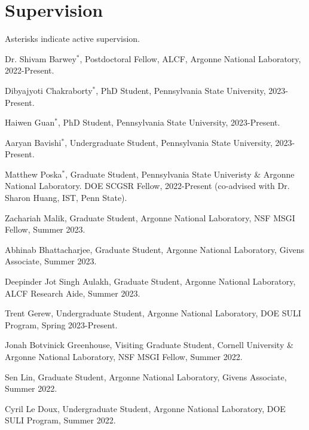 \documentclass[letterpaper]{article}
\renewenvironment{itemize}{
  \begin{list}{}{
    \setlength{\leftmargin}{1.5em}
  }
}{
  \end{list}
}
\begin{document}
\section*{Supervision}

Asterisks indicate active supervision.

\begin{itemize}

  \item Dr. Shivam Barwey$^\ast$, Postdoctoral Fellow, ALCF, Argonne National Laboratory, 2022-Present.

  \item Dibyajyoti Chakraborty$^\ast$, PhD Student, Pennsylvania State University, 2023-Present.

  \item Haiwen Guan$^\ast$, PhD Student, Pennsylvania State University, 2023-Present.

  \item Aaryan Bavishi$^\ast$, Undergraduate Student, Pennsylvania State University, 2023-Present.

  \item Matthew Poska$^\ast$, Graduate Student, Pennsylvania State Univeristy \& Argonne National Laboratory. DOE SCGSR Fellow, 2022-Present (co-advised with Dr. Sharon Huang, IST, Penn State).

  \item Zachariah Malik, Graduate Student, Argonne National Laboratory, NSF MSGI Fellow, Summer 2023.

  \item Abhinab Bhattacharjee, Graduate Student, Argonne National Laboratory, Givens Associate, Summer 2023.

  \item Deepinder Jot Singh Aulakh, Graduate Student, Argonne National Laboratory, ALCF Research Aide, Summer 2023.

  \item Trent Gerew, Undergraduate Student, Argonne National Laboratory, DOE SULI Program, Spring 2023-Present.

  \item Jonah Botvinick Greenhouse, Visiting Graduate Student, Cornell University \& Argonne National Laboratory, NSF MSGI Fellow, Summer 2022.

  \item Sen Lin, Graduate Student, Argonne National Laboratory, Givens Associate, Summer 2022.

  \item Cyril Le Doux, Undergraduate Student, Argonne National Laboratory, DOE SULI Program, Summer 2022.


\end{itemize}
\end{document}
